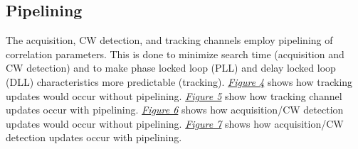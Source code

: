 \documentclass{article}
\begin{document}
\begin{multicols}{2}
\subsection{Pipelining}
The acquisition, CW detection, and tracking channels employ pipelining of correlation parameters. This is done to minimize search time (acquisition and CW detection) and to make phase locked loop (PLL) and delay locked loop (DLL) characteristics more predictable (tracking). \hyperlink{fig4}{\it Figure 4} shows how tracking updates would occur without pipelining. \hyperlink{fig5}{\it Figure 5} show how tracking channel updates occur with pipelining. \hyperlink{fig6}{\it Figure 6} shows how acquisition/CW detection updates would occur without pipelining. \hyperlink{fig7}{\it Figure 7} shows how acquisition/CW detection updates occur with pipelining.\\
\end{multicols}
\end{document}

